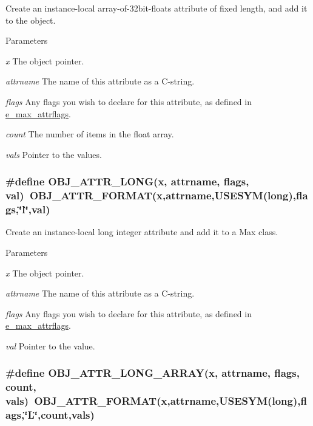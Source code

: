 Create an instance-\/local array-\/of-\/32bit-\/floats attribute of fixed length, and add it to the object. 
\begin{DoxyParams}{Parameters}
\item[{\em x}]The object pointer. \item[{\em attrname}]The name of this attribute as a C-\/string. \item[{\em flags}]Any flags you wish to declare for this attribute, as defined in \hyperlink{group__attr_gaf296cfc6741bb19207f6ed8062809115}{e\_\-max\_\-attrflags}. \item[{\em count}]The number of items in the float array. \item[{\em vals}]Pointer to the values. \end{DoxyParams}
\hypertarget{group__attr_gaf4efa843da34f7db4575ab1d8f3a21c5}{
\subsubsection[{OBJ\_\-ATTR\_\-LONG}]{\setlength{\rightskip}{0pt plus 5cm}\#define OBJ\_\-ATTR\_\-LONG(x, \/  attrname, \/  flags, \/  val)~OBJ\_\-ATTR\_\-FORMAT(x,attrname,USESYM(long),flags,\char`\"{}l\char`\"{},val)}}
\label{group__attr_gaf4efa843da34f7db4575ab1d8f3a21c5}


Create an instance-\/local long integer attribute and add it to a Max class. 
\begin{DoxyParams}{Parameters}
\item[{\em x}]The object pointer. \item[{\em attrname}]The name of this attribute as a C-\/string. \item[{\em flags}]Any flags you wish to declare for this attribute, as defined in \hyperlink{group__attr_gaf296cfc6741bb19207f6ed8062809115}{e\_\-max\_\-attrflags}. \item[{\em val}]Pointer to the value. \end{DoxyParams}
\hypertarget{group__attr_ga46a8ff560bbdc63a518d5f36f378c98e}{
\subsubsection[{OBJ\_\-ATTR\_\-LONG\_\-ARRAY}]{\setlength{\rightskip}{0pt plus 5cm}\#define OBJ\_\-ATTR\_\-LONG\_\-ARRAY(x, \/  attrname, \/  flags, \/  count, \/  vals)~OBJ\_\-ATTR\_\-FORMAT(x,attrname,USESYM(long),flags,\char`\"{}L\char`\"{},count,vals)}}
\label{group__attr_ga46a8ff560bbdc63a518d5f36f378c98e}


